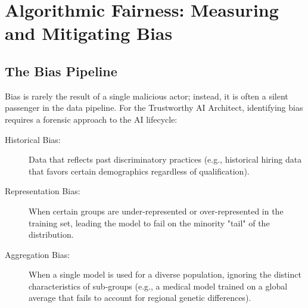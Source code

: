 
\chapter{Algorithmic Fairness: Measuring and Mitigating Bias}
\label{chap:fairness_bias}


\section{The Bias Pipeline}
\label{sec:bias_pipeline}

Bias is rarely the result of a single malicious actor; instead, it is often a silent passenger in the data pipeline. For the Trustworthy AI Architect, identifying bias requires a forensic approach to the AI lifecycle:

\begin{description}
  \item[Historical Bias:] 
        Data that reflects past discriminatory practices (e.g., historical hiring data that favors certain demographics regardless of qualification).
  \item[Representation Bias:]
        When certain groups are under-represented or over-represented in the training set, leading the model to fail on the minority "tail" of the distribution.
  \item[Aggregation Bias:]
        When a single model is used for a diverse population, ignoring the distinct characteristics of sub-groups (e.g., a medical model trained on a global average that fails to account for regional genetic differences).
\end{description}

